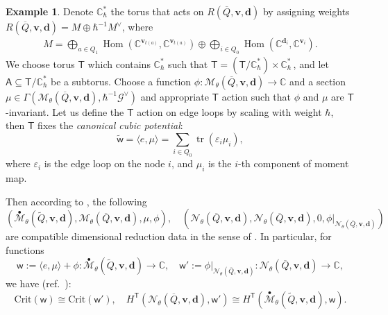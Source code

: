 \documentclass[10pt]{amsart}
\theoremstyle{definition}
\newtheorem{Example}[Theorem]{Example}
\numberwithin{equation}{section}
\newcommand{\C}{\mathbb{C}}
\newcommand{\Crit}{\mathrm{Crit}}
\newcommand{\bC}{\mathbb{C}}
\newcommand{\bv}{\mathbf{v}}
\newcommand{\bd}{\mathbf{d}}
\newcommand{\cM}{\mathcal{M}}
\newcommand{\cN}{\mathcal{N}}
\newcommand{\sA}{\mathsf{A}}
\newcommand{\sT}{\mathsf{T}}
\newcommand{\sw}{\mathsf{w}}
\newcommand{\Hom}{\operatorname{Hom}}
\newcommand{\tr}{\operatorname{tr}}
\begin{document}
\begin{Example}
Denote $\bC^*_\hbar$ the torus that acts on $R(\overline{Q},\bv,\bd)$ by assigning weights $R(\overline{Q},\bv,\bd)=M\oplus\hbar^{-1}M^\vee$, where
\begin{align*}
    M=\bigoplus_{a\in Q_1}\Hom(\bC^{\bv_{t(a)}},\bC^{\bv_{t(a)}})\oplus\bigoplus_{i\in Q_0}\Hom(\bC^{\bd_{i}},\bC^{\bv_{i}}).
\end{align*}
We choose torus $\sT$ which contains $\bC^*_\hbar$ such that $\sT=(\sT/\bC^*_\hbar)\times \bC^*_\hbar$\,, and let $\sA\subseteq \sT/\bC^*_\hbar$ be a subtorus. Choose a function $\phi\colon \cM_\theta(\overline{Q},\mathbf{v},\mathbf{d})\to \bC$ and a section $\mu\in \Gamma(\cM_\theta(\overline{Q},\bv,\bd),\mathcal \hbar^{-1}\mathcal G^\vee)$ and appropriate $\sT$ action such that $\phi$ and $\mu$ are $\sT$-invariant. Let us define the $\sT$ action on edge loops by scaling with weight $\hbar$, then $\sT$ fixes 
the \textit{canonical cubic potential}: 
\begin{equation}
\label{equ on can cub pot}\widetilde{\sw}=\langle e,\mu\rangle=\sum_{i\in Q_0}\tr(\varepsilon_i\mu_i), \end{equation} 
where $\varepsilon_i$ is the edge loop on the node $i$, and $\mu_i$ is the $i$-th component of moment map.

Then according to \cite[Ex.~6.13]{COZZ}, the following
$$\left(\overset{\bullet}{\cM}_\theta(\widetilde{Q},\mathbf{v},\mathbf{d}),\cM_\theta(\overline{Q},\mathbf{v},\mathbf{d}),\mu, \phi \right), \quad \left(\cN_{\theta}(\overline{Q},\mathbf{v},\mathbf{d}),\cN_{\theta}(\overline{Q},\mathbf{v},\mathbf{d}),0, \phi|_{\cN_{\theta}(\overline{Q},\mathbf{v},\mathbf{d})}\right)$$ are compatible dimensional reduction data in the sense of \cite[Def.~6.2]{COZZ}. In particular, for functions
$$\sw:=\langle e,\mu\rangle+\phi\colon \overset{\bullet}{\cM}_\theta(\widetilde{Q},\mathbf{v},\mathbf{d})\to \C, \quad \sw':=\phi|_{\cN_{\theta}(\overline{Q},\mathbf{v},\mathbf{d})}\colon \cN_{\theta}(\overline{Q},\mathbf{v},\mathbf{d})\to \C,
$$
we have (ref.~\cite[Props.~6.5,~6.9]{COZZ}):
\begin{equation}\label{equ on dim redd}\Crit(\sw)\cong \Crit(\sw'), \quad 
H^{\sT}(\cN_{\theta}(\overline{Q},\mathbf{v},\mathbf{d}),\sw')\cong H^{\sT}(\overset{\bullet}{\cM}_\theta(\widetilde{Q},\mathbf{v},\mathbf{d}),\sw). \end{equation}
\end{Example}
\end{document}

